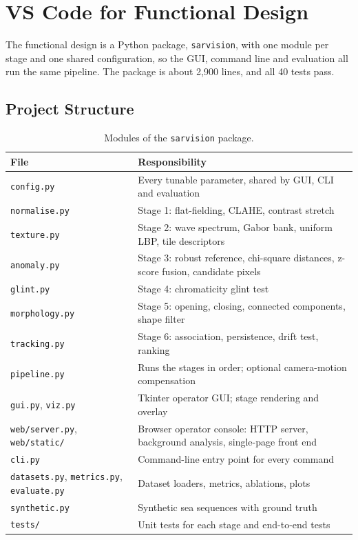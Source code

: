 \documentclass[11pt,a4paper]{article}
\begin{document}
\section{VS Code for Functional Design}

The functional design is a Python package, \texttt{sarvision}, with one module per stage and one shared configuration, so the GUI, command line and evaluation all run the same pipeline. The package is about 2,900 lines, and all 40 tests pass.

\subsection{Project Structure}

\begin{table}[H]
\centering
\small
\caption{Modules of the \texttt{sarvision} package.}
\label{tab:modules}
\begin{tabularx}{\textwidth}{@{}lY@{}}
\toprule
File & Responsibility \\
\midrule
\texttt{config.py} & Every tunable parameter, shared by GUI, CLI and evaluation \\
\texttt{normalise.py} & Stage 1: flat-fielding, CLAHE, contrast stretch \\
\texttt{texture.py} & Stage 2: wave spectrum, Gabor bank, uniform LBP, tile descriptors \\
\texttt{anomaly.py} & Stage 3: robust reference, chi-square distances, z-score fusion, candidate pixels \\
\texttt{glint.py} & Stage 4: chromaticity glint test \\
\texttt{morphology.py} & Stage 5: opening, closing, connected components, shape filter \\
\texttt{tracking.py} & Stage 6: association, persistence, drift test, ranking \\
\texttt{pipeline.py} & Runs the stages in order; optional camera-motion compensation \\
\texttt{gui.py}, \texttt{viz.py} & Tkinter operator GUI; stage rendering and overlay \\
\texttt{web/server.py}, \texttt{web/static/} & Browser operator console: HTTP server, background analysis, single-page front end \\
\texttt{cli.py} & Command-line entry point for every command \\
\texttt{datasets.py}, \texttt{metrics.py}, \texttt{evaluate.py} & Dataset loaders, metrics, ablations, plots \\
\texttt{synthetic.py} & Synthetic sea sequences with ground truth \\
\texttt{tests/} & Unit tests for each stage and end-to-end tests \\
\bottomrule
\end{tabularx}
\end{table}
\end{document}
